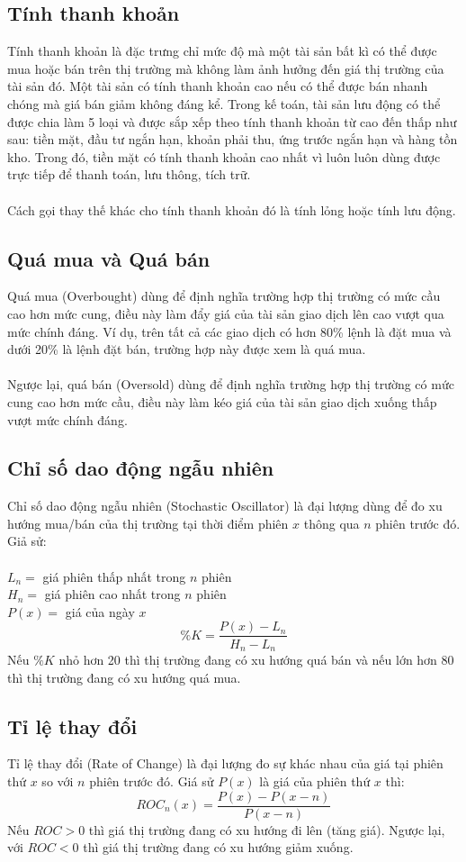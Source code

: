 \subsection{Tính thanh khoản}
Tính thanh khoản là đặc trưng chỉ mức độ mà một tài sản bất kì có thể được mua 
hoặc bán trên thị trường mà không làm ảnh hưởng đến giá thị trường của tài sản 
đó. Một tài sản có tính thanh khoản cao nếu có thể được bán nhanh chóng mà giá 
bán giảm không đáng kể. Trong kế toán, tài sản lưu động có thể được chia làm 5 
loại và được sắp xếp theo tính thanh khoản từ cao đến thấp như sau: tiền mặt, 
đầu tư ngắn hạn, khoản phải thu, ứng trước ngắn hạn và hàng tồn kho. Trong đó, 
tiền mặt có tính thanh khoản cao nhất vì luôn luôn dùng được trực tiếp để thanh 
toán, lưu thông, tích trữ.\\\\
Cách gọi thay thế khác cho tính thanh khoản đó là tính lỏng hoặc tính lưu động.
\subsection{Quá mua và Quá bán}
Quá mua (Overbought) dùng để định nghĩa trường hợp thị trường có mức cầu cao hơn 
mức cung, điều này làm đẩy giá của tài sản giao dịch lên cao vượt qua mức chính 
đáng. Ví dụ, trên tất cả các giao dịch có hơn 80\% lệnh là đặt mua và dưới 20\% 
là lệnh đặt bán, trường hợp này được xem là quá mua.\\\\
Ngược lại, quá bán (Oversold) dùng để định nghĩa trường hợp thị trường có mức 
cung cao hơn mức cầu, điều này làm kéo giá của tài sản giao dịch xuống thấp vượt 
mức chính đáng.
\subsection{Chỉ số dao động ngẫu nhiên}
Chỉ số dao động ngẫu nhiên (Stochastic Oscillator) là đại lượng dùng để đo xu 
hướng mua/bán của thị trường tại thời điểm phiên $x$ thông qua $n$ phiên trước 
đó. Giả sử:\\\\
\tab $L_{n} = $ giá phiên thấp nhất trong $n$ phiên\\
\tab $H_{n} = $ giá phiên cao nhất trong $n$ phiên\\
\tab $P(x) = $ giá của ngày $x$\\
\[\%K=\frac{P(x)-L_{n}}{H_{n}-L_{n}}\]
Nếu $ \%K $ nhỏ hơn 20 thì thị trường đang có xu hướng quá bán và nếu lớn hơn 
80 thì thị trường đang có xu hướng quá mua.
\subsection{Tỉ lệ thay đổi}
Tỉ lệ thay đổi (Rate of Change) là đại lượng đo sự khác nhau của giá tại phiên 
thứ $x$ so với $n$ phiên trước đó. Giá sử $P(x)$ là giá của phiên thứ $x$ thì:
\[ ROC_{n}(x)=\frac{P(x)-P(x-n)}{P(x-n)}\]
Nếu $ROC > 0$ thì giá thị trường đang có xu hướng đi lên (tăng giá).
Ngược lại, với $ROC < 0$ thì giá thị trường đang có xu hướng giảm xuống.
